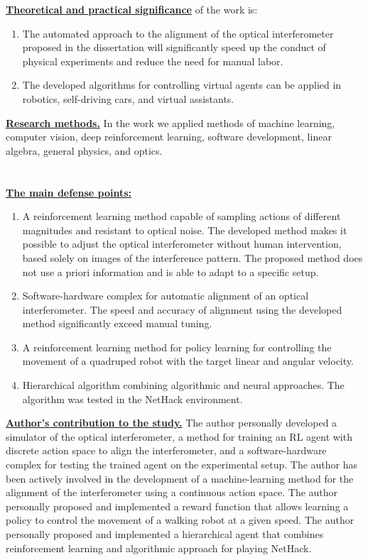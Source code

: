 \underline{\textbf{Theoretical and practical significance}} of the work is:
\begin{enumerate}[beginpenalty=10000] %
  \item The automated approach to the alignment of the optical interferometer proposed in the dissertation will significantly speed up the conduct of physical experiments and reduce the need for manual labor.
  \item The developed algorithms for controlling virtual agents can be applied in robotics, self-driving cars, and virtual assistants.
\end{enumerate}

\underline{\textbf{Research methods.}} In the work we applied methods of machine learning, computer vision, deep reinforcement learning, software development, linear algebra, general physics, and optics.

\section*{}

\underline{\textbf{The main defense points:}}
\begin{enumerate}[beginpenalty=10000] %
  \item A reinforcement learning method capable of sampling actions of different magnitudes and resistant to optical noise. The developed method makes it possible to adjust the optical interferometer without human intervention, based solely on images of the interference pattern. The proposed method does not use a priori information and is able to adapt to a specific setup.
  \item Software-hardware complex for automatic alignment of an optical interferometer. The speed and accuracy of alignment using the developed method significantly exceed manual tuning.
  \item A reinforcement learning method for policy learning for controlling the movement of a quadruped robot with the target linear and angular velocity.
  \item Hierarchical algorithm combining algorithmic and neural approaches. The algorithm was tested in the NetHack environment.
\end{enumerate}

\underline{\textbf{Author’s contribution to the study.}} The author personally developed a simulator of the optical interferometer, a method for training an RL agent with discrete action space to align the interferometer, and a software-hardware complex for testing the trained agent on the experimental setup. The author has been actively involved in the development of a machine-learning method for the alignment of the interferometer using a continuous action space. The author personally proposed and implemented a reward function that allows learning a policy to control the movement of a walking robot at a given speed. The author personally proposed and implemented a hierarchical agent that combines reinforcement learning and algorithmic approach for playing NetHack. 

